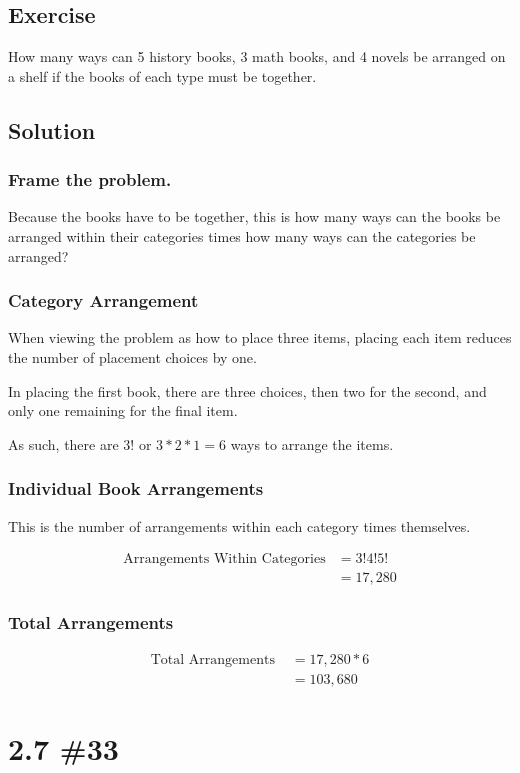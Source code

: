 \documentclass[12pt]{article}
\begin{document}
\subsection{Exercise}
How many ways can 5 history books, 3 math books, and 4 novels be arranged on a shelf if the books of each type must be together.


\subsection{Solution}
\subsubsection{Frame the problem.}
Because the books have to be together, this is how many ways can the books be arranged within their categories 
times how many ways can the categories be arranged?

\subsubsection{Category Arrangement}
When viewing the problem as how to place three items, placing each item reduces the number of placement choices
by one.

In placing the first book, there are three choices, then two for the second, and only one remaining for the final
item.

As such, there are $3! $ or $3*2*1=6$ ways to arrange the items.

\subsubsection{Individual Book Arrangements}
This is the number of arrangements within each category times themselves.

\begin{align*}
  \text{Arrangements Within Categories}&=3!4!5! \\
  &= 17,280
\end{align*}

\subsubsection{Total Arrangements}
\begin{align*}
  \text{Total Arrangements }&=17,280*6 \\
  &=103,680
\end{align*}

\section{2.7 \#33} 
\end{document}
